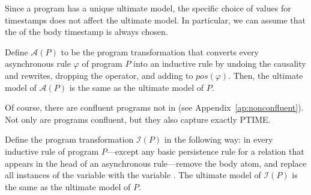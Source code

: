 Since a \slang program has a unique ultimate model, the specific choice of values for timestamps does not affect the ultimate model.
In particular, we can assume that the  of the body timestamp is always chosen.

\begin{corollary}
\label{cor:no-async}
Define $\mathcal{A}(P)$ to be the program transformation that converts every asynchronous rule $\varphi$ of \slang program $P$ into an inductive rule by undoing the causality and  rewrites, dropping the  operator, and adding  to $pos(\varphi)$.  Then, the ultimate model of $\mathcal{A}(P)$ is the same as the ultimate model of $P$.
\end{corollary}

Of course, there are confluent \lang programs not in \slang (see Appendix~\ref{ap:nonconfluent}).  Not only are \slang programs confluent, but they also capture exactly PTIME.

\begin{lemma}
\label{lem:no-inductive}
Define the program transformation $\mathcal{I}(P)$ in the following way: in every inductive rule of \slang program 
$P$---except any basic persistence rule for a relation that appears in the head of an asynchronous rule---remove 
the  body atom, and replace all instances of the variable  with the variable .  
The ultimate model of $\mathcal{I}(P)$ is the same as the ultimate model of $P$.
\end{lemma}

